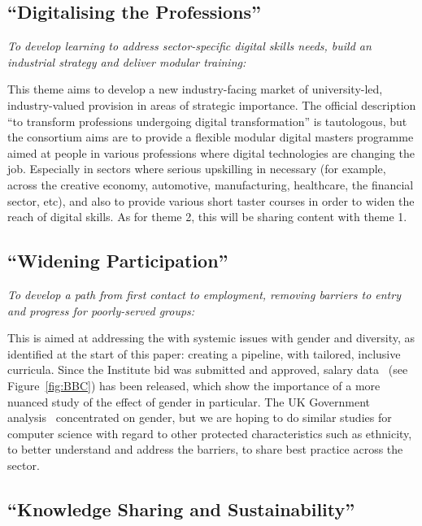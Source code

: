 \documentclass[sigconf,anonymous]{acmart}
\begin{document}
\subsection{``Digitalising the Professions''}

{\emph{To develop learning to address sector-specific digital skills
needs, build an industrial strategy and deliver modular
training:}}\newline

\noindent This theme aims to develop a new industry-facing market of
university-led, industry-valued provision in areas of strategic
importance. The official description ``to transform professions
undergoing digital transformation'' \cite{DfE2018a} is tautologous,
but the consortium aims are to provide a flexible modular digital
masters programme aimed at people in various professions where digital
technologies are changing the job. Especially in sectors where serious
upskilling in necessary (for example, across the creative economy,
automotive, manufacturing, healthcare, the financial sector, etc), and
also to provide various short taster courses in order to widen the
reach of digital skills. As for theme 2, this will be sharing content
with theme 1.

\subsection{``Widening Participation''}

{\emph{To develop a path from first contact to employment, removing
barriers to entry and progress for poorly-served groups:}}\newline

\noindent This is aimed at addressing the with systemic issues with
gender and diversity, as identified at the start of this paper:
creating a pipeline, with tailored, inclusive curricula. Since
the Institute bid was submitted and approved, salary
data~\cite{DfE2018d} (see Figure~\ref{fig:BBC}) has been released,
which show the importance of a more nuanced study of the effect of
gender in particular. The UK Government analysis~\cite{DfE2018d}
concentrated on gender, but we are hoping to do similar studies for
computer science with regard to other protected characteristics such
as ethnicity, to better understand and address the barriers, to share
best practice across the sector.

\subsection{``Knowledge Sharing and Sustainability''}
\end{document}
